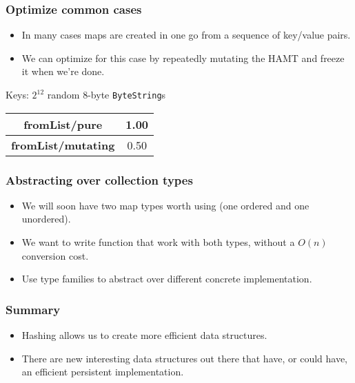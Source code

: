 \documentclass{beamer}
\begin{document}
\begin{frame}
  \frametitle{Optimize common cases}
  \begin{itemize}
  \item In many cases maps are created in one go from a sequence of
    key/value pairs.
  \item We can optimize for this case by repeatedly mutating the HAMT
    and freeze it when we're done.
  \end{itemize}

  \bigskip
  Keys: $2^{12}$ random 8-byte \lstinline!ByteString!s

  \bigskip
  \begin{tabular}{|c|c|}
    \hline \textbf{fromList/pure} & 1.00 \\
    \hline \textbf{fromList/mutating} & 0.50 \\
    \hline
  \end{tabular}
\end{frame}

\begin{frame}
  \frametitle{Abstracting over collection types}
  \begin{itemize}
  \item We will soon have two map types worth using (one ordered and one
    unordered).
  \item We want to write function that work with both types, without a
    $O(n)$ conversion cost.
  \item Use type families to abstract over different concrete
    implementation.
  \end{itemize}
\end{frame}

\begin{frame}
  \frametitle{Summary}
  \begin{itemize}
  \item Hashing allows us to create more efficient data structures.
  \item There are new interesting data structures out there that have,
    or could have, an efficient persistent implementation.
  \end{itemize}
\end{frame}
\end{document}

